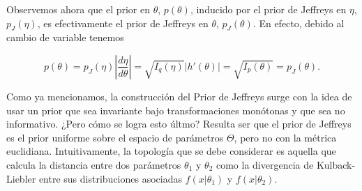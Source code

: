Observemos ahora que el prior en $\theta$, $p(\theta)$, inducido por el prior de Jeffreys en $\eta$, $p_J(\eta)$, es efectivamente el prior de Jeffreys en $\theta$, $p_J(\theta)$. En efecto, debido al cambio de variable tenemos

\begin{equation}
	p(\theta) = p_J(\eta) \left|\frac{d \eta}{d \theta}\right| = \sqrt{I_q(\eta)}\left|h'(\theta)\right| = \sqrt{I_p(\theta)} = p_J(\theta).
\end{equation}

Como ya mencionamos, la construcción del Prior de Jeffreys surge con la idea de usar un prior que sea invariante bajo transformaciones monótonas y que sea no informativo. ¿Pero cómo se logra esto últmo? Resulta ser que el prior de Jeffreys es el prior uniforme sobre el espacio de parámetros $\Theta$, pero no con la métrica euclidiana. Intuitivamente, la topología que se debe considerar es aquella que calcula la distancia entre dos parámetros $\theta_1$ y $\theta_2$ como la divergencia de Kulback-Liebler entre sus distribuciones asociadas $f(x|\theta_1)$ y $f(x|\theta_2)$.